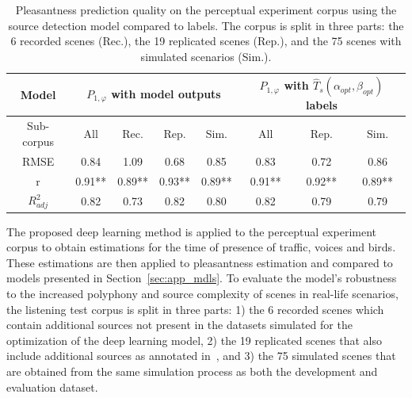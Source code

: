 \documentclass[twocolumn]{article}
\begin{document}
\begin{table}[t]
\centering
\caption{Pleasantness prediction quality on the perceptual experiment corpus using the source detection model compared to labels. The corpus is split in three parts: the 6 recorded scenes (Rec.), the 19 replicated scenes (Rep.), and the 75 scenes with simulated scenarios (Sim.).}
\label{tab:pppred}
\begin{tabular}{ c | c c c c | c c c }
\hline
	Model & \multicolumn{4}{|c}{$P_{1, \varphi}$ with model outputs} & \multicolumn{3}{|c}{$P_{1, \varphi}$ with $\hat T_s(\alpha_{opt}, \beta_{opt})$ labels} \\ \hline
	Sub-corpus & All & Rec. & Rep. & Sim. & All & Rep. & Sim. \\ \hline
	RMSE & 0.84 & 1.09 & 0.68 & 0.85 & 0.83 & 0.72 & 0.86 \\ \hline
	r & 0.91** & 0.89** & 0.93** & 0.89** & 0.91** & 0.92** & 0.89** \\ \hline
	$R^2_{adj}$ & 0.82 & 0.73 & 0.82 & 0.80 & 0.82 & 0.79 & 0.79 \\ \hline
\end{tabular}
\end{table}


The proposed deep learning method is applied to the perceptual experiment corpus to obtain estimations for the time of presence of traffic, voices and birds. These estimations are then applied to pleasantness estimation and compared to models presented in Section~\ref{sec:app_mdls}. To evaluate the model's robustness to the increased polyphony and source complexity of scenes in real-life scenarios, the listening test corpus is split in three parts: 1) the 6 recorded scenes which contain additional sources not present in the datasets simulated for the optimization of the deep learning model, 2) the 19 replicated scenes that also include additional sources as annotated in~\cite{gloaguen2017}, and 3) the 75 simulated scenes that are obtained from the same simulation process as both the development and evaluation dataset.
\end{document}

